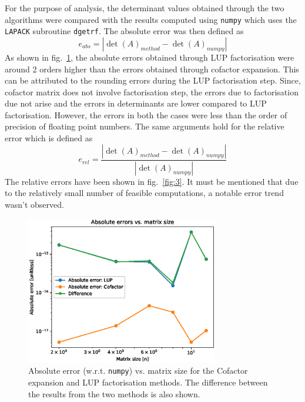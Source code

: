 \documentclass[11pt, oneside]{article}
\begin{document}
For the purpose of analysis, the determinant values obtained through the two algorithms were compared with the results computed using \texttt{numpy} which uses the \texttt{LAPACK} subroutine \texttt{dgetrf}. The absolute error was then defined as $$e_{abs} = |\det(A)_{method} - \det(A)_{numpy}|$$ As shown in fig.~\ref{fig:2}, the absolute errors obtained through LUP factorisation were around 2 orders higher than the errors obtained through cofactor expansion. This can be attributed to the rounding errors during the LUP factorisation step. Since, cofactor matrix does not involve factorisation step, the errors due to factorisation due not arise and the errors in determinants are lower compared to LUP factorisation. However, the errors in both the cases were less than the order of precision of floating point numbers. The same arguments hold for the relative error which is defined as $$e_{rel} = \frac{|\det(A)_{method} - \det(A)_{numpy}|}{|\det(A)_{numpy}|}$$ The relative errors have been shown in fig.~\ref{fig:3}. It must be mentioned that due to the relatively small number of feasible computations, a notable error trend wasn't observed.
\begin{figure}[]
      \centering
      \includegraphics[width=0.75\textwidth]{figure/Figure_2.eps}
      \caption{Absolute error (w.r.t. \texttt{numpy})  vs. matrix size for the Cofactor expansion and LUP factorisation methods. The difference between the results from the two methods is also shown.}
      \label{fig:2}
\end{figure}
\end{document}
